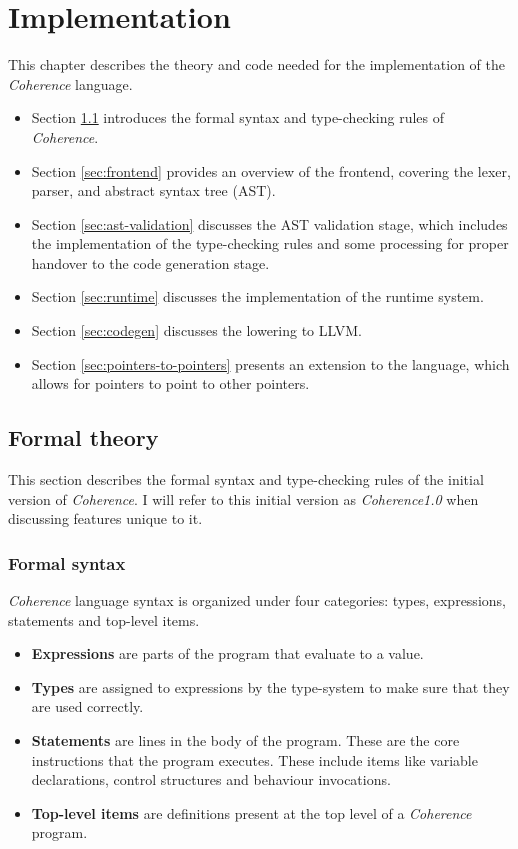 \documentclass[a4paper,12pt,fleqn]{article}
\begin{document}
\section{Implementation}
This chapter describes the theory and code needed for the implementation of the \textit{Coherence} language.
\begin{itemize}
    \item Section \ref{sec:theory} introduces the formal syntax and type-checking rules of \textit{Coherence}.
    \item Section \ref{sec:frontend} provides an overview of the frontend, covering the lexer, parser, and abstract syntax tree (AST).
    \item Section \ref{sec:ast-validation} discusses the AST validation stage, which includes the implementation of the type-checking rules and some processing for proper handover to the code generation stage.
    \item Section \ref{sec:runtime} discusses the implementation of the runtime system.
    \item Section \ref{sec:codegen} discusses the lowering to LLVM.
    \item Section \ref{sec:pointers-to-pointers} presents an extension to the language, which allows for pointers to point to other pointers.
\end{itemize}

\subsection{Formal theory} \label{sec:theory}
This section describes the formal syntax and type-checking rules of the initial version of \textit{Coherence}. I will refer to this initial version as \textit{Coherence1.0} when discussing features unique to it.
\subsubsection{Formal syntax}
\textit{Coherence} language syntax is organized under four categories: types, expressions, statements and top-level items.
\begin{itemize}
    \item \textbf{Expressions} are parts of the program that evaluate to a value.
    \item \textbf{Types} are assigned to expressions by the type-system to make sure that they are used correctly.
    \item \textbf{Statements} are lines in the body of the program. These are the core instructions that the program executes. These include items like variable declarations, control structures and behaviour invocations.
    \item \textbf{Top-level items} are definitions present at the top level of a \textit{Coherence} program.
\end{itemize}
\end{document}

